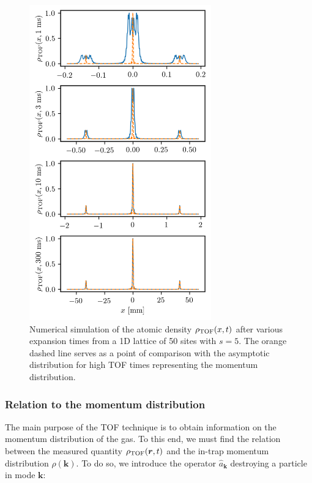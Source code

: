 \begin{figure}
    \centering
    \includegraphics[width=0.7\textwidth]{Fig/Chapter2/TOF_expansion.png}
    \caption{Numerical simulation of the atomic density $\rho_{\rm{TOF}}(x,t)$ after various expansion times from a 1D lattice of 50 sites with $s=5$. The orange dashed line serves as a point of comparison with the asymptotic distribution for high TOF times representing the momentum distribution.}
    \label{fig:sim_expansion}
\end{figure}

\subsubsection{Relation to the momentum distribution}

The main purpose of the TOF technique is to obtain information on the momentum distribution of the gas. To this end, we must find the relation between the measured quantity $\rho_{\rm{TOF}}(\bm{r},t)$ and the in-trap momentum distribution $\rho(\bm{k})$. To do so, we introduce the operator $\hat{a}_{\bm{k}}$ destroying a particle in mode $\bm{k}$:

